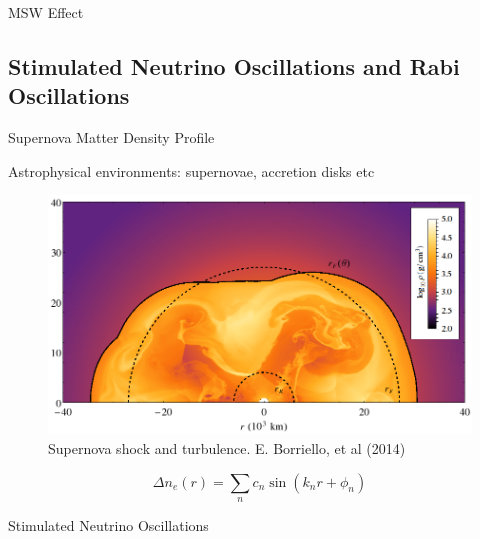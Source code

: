 \documentclass[9pt]{beamer}
\begin{document}
\begin{darkframes}
\begin{frame}{MSW Effect}
\end{frame}


\subsection{Stimulated Neutrino Oscillations and Rabi Oscillations}

\begin{frame}{Supernova Matter Density Profile}

\begin{tcolorbox}[title=Why Do We Care]

Astrophysical environments: supernovae, accretion disks etc

\end{tcolorbox}

\begin{figure}
    \centering
    \includegraphics[height=0.5\textheight]{assets/supernova-shock-turbulence.png}
    \caption*{Supernova shock and turbulence. E. Borriello, et al  (2014)}
\end{figure}

\vspace{-1em}
\begin{equation*}
\Delta n_e (r) = \sum_n c_n \sin( k_n r + \phi_n )
\end{equation*}


\end{frame}










\begin{frame}{Stimulated Neutrino Oscillations}



\end{frame}
\end{darkframes}
\end{document}
